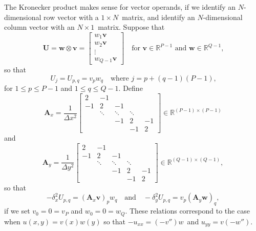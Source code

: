 The Kronecker product makes sense for vector operands, if we identify an
$N$-dimensional row vector with a $1\times N$~matrix, and identify an 
$N$-dimensional column vector with an $N\times1$~matrix.  Suppose that
\[
\newcommand{\bs}[1]{\boldsymbol{#1}}
\bs{U}=\bs{w}\otimes\bs{v}
    =\begin{bmatrix}w_1\bs{v}\\ w_2\bs{v}\\ \vdots\\ w_{Q-1}\bs{v}\end{bmatrix}
\quad\text{for $\bs{v}\in\mathbb{R}^{P-1}$ and $\bs{w}\in\mathbb{R}^{Q-1}$,}
\]
so that
\[
U_j=U_{p,q}=v_pw_q\quad\text{where $j=p+(q-1)(P-1)$,}
\]
for $1\le p\le P-1$ and $1\le q\le Q-1$.  Define
\[
\boldsymbol{A}_x=\frac{1}{\Delta x^2}\begin{bmatrix}
 2&    -1&      &      &\\
-1&     2&    -1&      &\\
  &\ddots&\ddots&\ddots&\\
  &      &    -1&     2&-1\\
  &      &      &    -1& 2\end{bmatrix}\in\mathbb{R}^{(P-1)\times(P-1)}
\]
and
\[
\boldsymbol{A}_y=\frac{1}{\Delta y^2}\begin{bmatrix}
 2&    -1&      &      &\\
-1&     2&    -1&      &\\
  &\ddots&\ddots&\ddots&\\
  &      &    -1&     2&-1\\
  &      &      &    -1& 2\end{bmatrix}\in\mathbb{R}^{(Q-1)\times(Q-1)},
\]
so that
\begin{equation}\label{eq: delta x y separable}
-\delta_x^2U_{p,q}=(\boldsymbol{A}_x\boldsymbol{v})_pw_q
\quad\text{and}\quad
-\delta_y^2U_{p,q}=v_p(\boldsymbol{A}_y\boldsymbol{w})_q,
\end{equation}
if we set $v_0=0=v_P$ and $w_0=0=w_Q$.  These relations correspond to the case 
when $u(x,y)=v(x)w(y)$ so that $-u_{xx}=(-v'')w$~and $u_{yy}=v(-w'')$.

